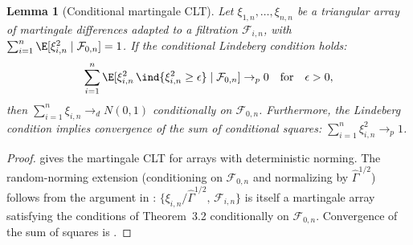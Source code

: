 \documentclass{article}
\newtheorem{lemma}[theorem]{Lemma}
\begin{document}
\begin{lemma}[Conditional martingale CLT]
\label{lem:conditional-clt}
Let $\xi_{1,n}, \ldots, \xi_{n,n}$ be a triangular array
of martingale differences
adapted to a filtration $\mathcal{F}_{i,n}$,
with $\sum_{i=1}^n \E[\xi_{i,n}^2 \mid \mathcal{F}_{0,n}] = 1$.
If the conditional Lindeberg condition holds:
\[
\sum_{i=1}^n
  \E[\xi_{i,n}^2\,\ind{\xi_{i,n}^2 \ge \epsilon}
    \mid \mathcal{F}_{0,n}] \to_p 0
\qfor \epsilon > 0,
\]
then $\sum_{i=1}^n \xi_{i,n} \to_d N(0,1)$
conditionally on $\mathcal{F}_{0,n}$.
Furthermore,
the Lindeberg condition implies convergence
of the sum of conditional squares:
$\sum_{i=1}^n \xi_{i,n}^2 \to_p 1$.
\end{lemma}
\begin{proof}
gives the martingale CLT
for arrays with deterministic norming.
The random-norming extension
(conditioning on $\mathcal{F}_{0,n}$
and normalizing by $\hat\Gamma^{1/2}$)
follows from the argument
in \citet[\S3.2(vi)]{hall2014martingale}:
$\{\xi_{i,n}/\hat\Gamma^{1/2},\, \mathcal{F}_{i,n}\}$
is itself a martingale array
satisfying the conditions of Theorem~3.2
conditionally on $\mathcal{F}_{0,n}$.
Convergence of the sum of squares
is \citet[Theorem~2.23]{hall2014martingale}.
\end{proof}
\end{document}
